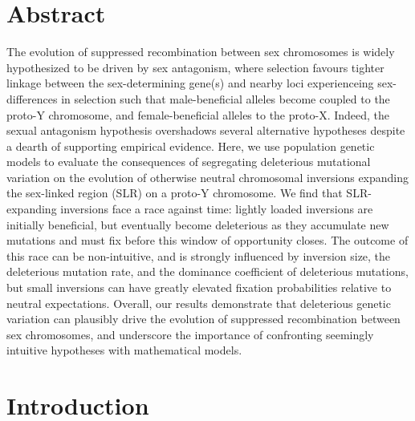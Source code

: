 \documentclass[11pt]{article}
\begin{document}

\linenumbers{}
\modulolinenumbers[1]

\newpage{}



\newpage{}
\section*{Abstract}

The evolution of suppressed recombination between sex chromosomes is widely hypothesized to be driven by sex antagonism, where selection favours tighter linkage between the sex-determining gene(s) and nearby loci experienceing sex-differences in selection such that male-beneficial alleles become coupled to the proto-Y chromosome, and female-beneficial alleles to the proto-X. Indeed, the sexual antagonism hypothesis overshadows several alternative hypotheses despite a dearth of supporting empirical evidence. Here, we use population genetic models to evaluate the consequences of segregating deleterious mutational variation on the evolution of otherwise neutral chromosomal inversions expanding the sex-linked region (SLR) on a proto-Y chromosome. We find that SLR-expanding inversions face a race against time: lightly loaded inversions are initially beneficial, but eventually become deleterious as they accumulate new mutations and must fix before this window of opportunity closes. The outcome of this race can be non-intuitive, and is strongly influenced by inversion size, the deleterious mutation rate, and the dominance coefficient of deleterious mutations, but small inversions can have greatly elevated fixation probabilities relative to neutral expectations. Overall, our results demonstrate that deleterious genetic variation can plausibly drive the evolution of suppressed recombination between sex chromosomes, and underscore the importance of confronting seemingly intuitive hypotheses with mathematical models.

\newpage{}

\section*{Introduction}
\end{document}
